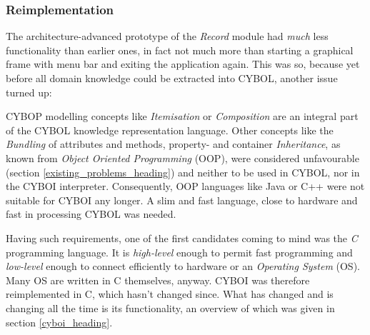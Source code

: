 %
%
%
%
%
%
%

\subsubsection{Reimplementation}
\label{reimplementation_heading}

The architecture-advanced prototype of the \emph{Record} module had \emph{much}
less functionality than earlier ones, in fact not much more than starting a
graphical frame with menu bar and exiting the application again. This was so,
because yet before all domain knowledge could be extracted into CYBOL, another
issue turned up:

CYBOP modelling concepts like \emph{Itemisation} or \emph{Composition} are an
integral part of the CYBOL knowledge representation language. Other concepts
like the \emph{Bundling} of attributes and methods, property- and container
\emph{Inheritance}, as known from \emph{Object Oriented Programming} (OOP),
were considered unfavourable (section \ref{existing_problems_heading}) and
neither to be used in CYBOL, nor in the CYBOI interpreter. Consequently,
OOP languages like Java or C++ were not suitable for CYBOI any longer. A slim
and fast language, close to hardware and fast in processing CYBOL was needed.

Having such requirements, one of the first candidates coming to mind was the
\emph{C} programming language. It is \emph{high-level} enough to permit fast
programming and \emph{low-level} enough to connect efficiently to hardware or
an \emph{Operating System} (OS). Many OS are written in C themselves, anyway.
CYBOI was therefore reimplemented in C, which hasn't changed since. What has
changed and is changing all the time is its functionality, an overview of which
was given in section \ref{cyboi_heading}.

